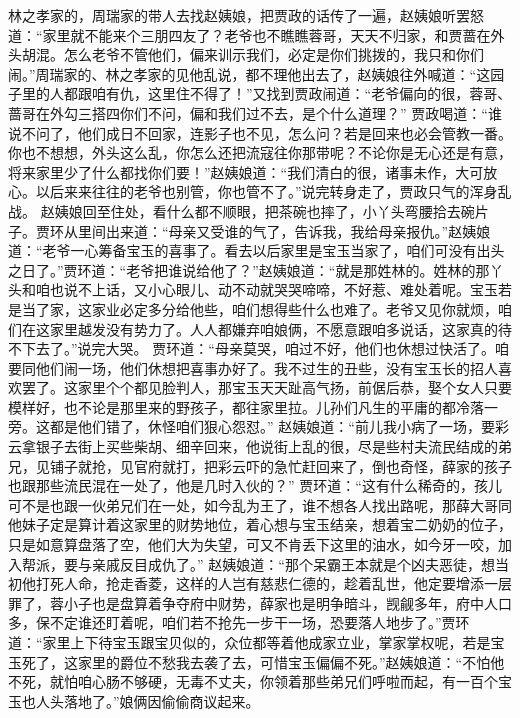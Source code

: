 \documentclass[12pt,oneside]{book}
\begin{document}
林之孝家的，周瑞家的带人去找赵姨娘，把贾政的话传了一遍，赵姨娘听罢怒道：“家里就不能来个三朋四友了？老爷也不瞧瞧蓉哥，天天不归家，和贾蔷在外头胡混。怎么老爷不管他们，偏来训示我们，必定是你们挑拨的，我只和你们闹。”周瑞家的、林之孝家的见他乱说，都不理他出去了，赵姨娘往外喊道：“这园子里的人都跟咱有仇，这里住不得了！”又找到贾政闹道：“老爷偏向的很，蓉哥、蔷哥在外勾三搭四你们不问，偏和我们过不去，是个什么道理？”
贾政喝道：“谁说不问了，他们成日不回家，连影子也不见，怎么问？若是回来也必会管教一番。你也不想想，外头这么乱，你怎么还把流寇往你那带呢？不论你是无心还是有意，将来家里少了什么都找你们要！”赵姨娘道：“我们清白的很，诸事未作，大可放心。以后来来往往的老爷也别管，你也管不了。”说完转身走了，贾政只气的浑身乱战。
赵姨娘回至住处，看什么都不顺眼，把茶碗也摔了，小丫头弯腰拾去碗片子。贾环从里间出来道：“母亲又受谁的气了，告诉我，我给母亲报仇。”赵姨娘道：“老爷一心筹备宝玉的喜事了。看去以后家里是宝玉当家了，咱们可没有出头之日了。”贾环道：“老爷把谁说给他了？”赵姨娘道：“就是那姓林的。姓林的那丫头和咱也说不上话，又小心眼儿、动不动就哭哭啼啼，不好惹、难处着呢。宝玉若是当了家，这家业必定多分给他些，咱们想得些什么也难了。老爷又见你就烦，咱们在这家里越发没有势力了。人人都嫌弃咱娘俩，不愿意跟咱多说话，这家真的待不下去了。”说完大哭。
贾环道：“母亲莫哭，咱过不好，他们也休想过快活了。咱要同他们闹一场，他们休想把喜事办好了。我不过生的丑些，没有宝玉长的招人喜欢罢了。这家里个个都见脸判人，那宝玉天天趾高气扬，前倨后恭，娶个女人只要模样好，也不论是那里来的野孩子，都往家里拉。儿孙们凡生的平庸的都冷落一旁。这都是他们错了，休怪咱们狠心怨怼。”
赵姨娘道：“前儿我小病了一场，要彩云拿银子去街上买些柴胡、细辛回来，他说街上乱的很，尽是些村夫流民结成的弟兄，见铺子就抢，见官府就打，把彩云吓的急忙赶回来了，倒也奇怪，薛家的孩子也跟那些流民混在一处了，他是几时入伙的？”
贾环道：“这有什么稀奇的，孩儿可不是也跟一伙弟兄们在一处，如今乱为王了，谁不想各人找出路呢，那薛大哥同他妹子定是算计着这家里的财势地位，着心想与宝玉结亲，想着宝二奶奶的位子，只是如意算盘落了空，他们大为失望，可又不肯丢下这里的油水，如今牙一咬，加入帮派，要与亲戚反目成仇了。”
赵姨娘道：“那个呆霸王本就是个凶夫恶徒，想当初他打死人命，抢走香菱，这样的人岂有慈悲仁德的，趁着乱世，他定要增添一层罪了，蓉小子也是盘算着争夺府中财势，薛家也是明争暗斗，觊觎多年，府中人口多，保不定谁还盯着呢，咱们若不抢先一步干一场，恐要落人地步了。”贾环道：“家里上下待宝玉跟宝贝似的，众位都等着他成家立业，掌家掌权呢，若是宝玉死了，这家里的爵位不愁我去袭了去，可惜宝玉偏偏不死。”赵姨娘道：“不怕他不死，就怕咱心肠不够硬，无毒不丈夫，你领着那些弟兄们呼啦而起，有一百个宝玉也人头落地了。”娘俩因偷偷商议起来。
\end{document}
